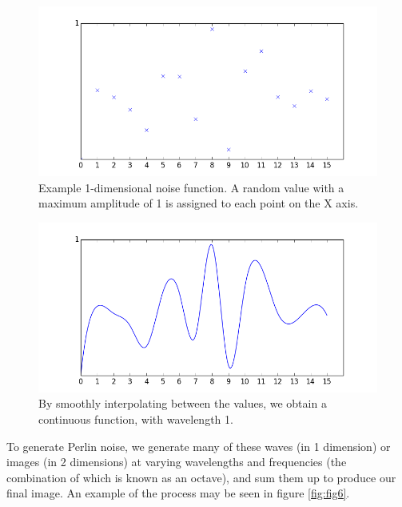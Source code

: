 \documentclass[12pt,a4paper]{article}
\begin{document}
\begin{figure}[h!]
  \centering
 	\includegraphics[scale=0.5]{images/figure2.png}
	\caption[]{Example 1-dimensional noise function. A random value with a maximum amplitude of 1 is assigned to each point on the X axis.}
	\label{fig:fig4}
\end{figure}

\begin{figure}
  \centering
 	\includegraphics[scale=0.5]{images/figure1.png}
	\caption[]{By smoothly interpolating between the values, we obtain a continuous function, with wavelength 1.}
	\label{fig:fig5}
\end{figure}

To generate Perlin noise, we generate many of these waves (in 1 dimension) or images (in 2 dimensions) at varying wavelengths and frequencies (the combination of which is known as an octave), and sum them up to produce our final image. An example of the process may be seen in figure \ref{fig:fig6}.
\end{document}
